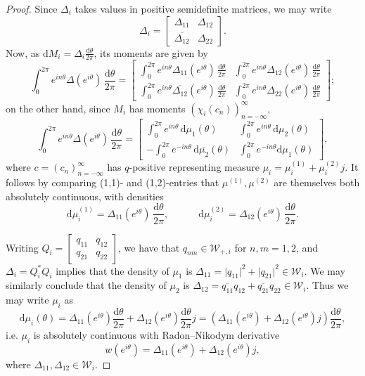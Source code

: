 \documentclass[11pt,reqno]{amsart}
\def\x{\chi}
\def\th{\theta}
\def\D{\Delta}
\def\rmd{\mathrm{d}}
\theoremstyle{definition}
\numberwithin{equation}{section}
\begin{document}
\begin{proof}
    Since \(\D_i\) takes values in positive semidefinite matrices, we may write
    \[
        \D_i = \begin{bmatrix}\D_{11} & \D_{12} \\[6pt] \overline{\D_{12}} & \D_{22} \end{bmatrix}.
    \]
    Now, as \(\rmd M_i = \D_i \frac{\rmd\th}{2\pi}\), its moments are given by
    \[
        \int_0^{2\pi} e^{i n \th} \D(e^{i\th}) \, \frac{\rmd\th}{2\pi} = \begin{bmatrix} \int_0^{2\pi} e^{i n \th} \D_{11}(e^{i\th}) \, \frac{\rmd\th}{2\pi} & \int_0^{2\pi} e^{i n \th} \D_{12}(e^{i\th}) \, \frac{\rmd\th}{2\pi} \\[6pt] \int_0^{2\pi} e^{i n \th} \overline{\D_{12}}(e^{i\th}) \, \frac{\rmd\th}{2\pi} & \int_0^{2\pi} e^{i n \th} \D_{22}(e^{i\th}) \, \frac{\rmd\th}{2\pi} \end{bmatrix};
    \]
    on the other hand, since \(M_i\) has moments \((\x_i(c_n))_{n=-\infty}^{\infty}\),
    \[
        \int_0^{2\pi} e^{i n \th} \D(e^{i\th}) \, \frac{\rmd\th}{2\pi} = \begin{bmatrix} \int_0^{2\pi} e^{i n \th} \, \rmd\mu_1(\th) & \int_0^{2\pi} e^{i n \th} \, \rmd\mu_2(\th) \\[6pt] -\int_0^{2\pi} e^{-i n \th} \, \rmd\overline{\mu_2}(\th) & \int_0^{2\pi} e^{-i n \th} \rmd\mu_1(\th)\end{bmatrix},
    \]
    where \(c = (c_n)_{n=-\infty}^{\infty}\) has \(q\)-positive representing measure \(\mu_i = \mu_i^{(1)} + \mu_i^{(2)} j\). It follows by comparing (1,1)- and (1,2)-entries that \(\mu^{(1)}, \mu^{(2)}\) are themselves both absolutely continuous, with densities
    \[
        \rmd\mu_i^{(1)} = \D_{11}(e^{i\th})\, \frac{\rmd\th}{2\pi}, \quad \quad \quad \rmd\mu_i^{(2)} = \D_{12}(e^{i\th})\,\frac{\rmd\th}{2\pi}.
    \]
    
    Writing \(Q_i = \begin{bmatrix}q_{11} & q_{12} \\ q_{21} & q_{22} \end{bmatrix}\), we have that \(q_{nm} \in \mathscr{W}_{+,i}\) for \(n,m=1,2\), and \(\D_i = Q_i^* Q_i\) implies that the density of \(\mu_1\) is \(\D_{11} = \lvert q_{11} \rvert^2 + \lvert q_{21} \rvert^2 \in \mathscr{W}_i\). We may similarly conclude that the density of \(\mu_2\) is \(\D_{12} = \overline{q_{11}}q_{12} + \overline{q_{21}}q_{22} \in \mathscr{W}_i\). Thus we may write \(\mu_i\) as
    \[
        \rmd\mu_i(\th) = \D_{11}(e^{i\th})\frac{\rmd\th}{2\pi} + \D_{12}(e^{i\th})\frac{\rmd\th}{2\pi}j = \left(\D_{11}(e^{i\th}) + \D_{12}(e^{i\th})j\right)\frac{\rmd\th}{2\pi},
    \]
    i.e. \(\mu_i\) is absolutely continuous with Radon--Nikodym derivative
    \[
        w(e^{i\th}) = \D_{11}(e^{i\th}) + \D_{12}(e^{i\th})j,
    \]
    where \(\D_{11}, \D_{12} \in \mathscr{W}_i\).


\end{proof}
\end{document}
